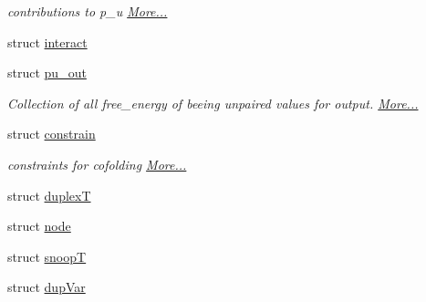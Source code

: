 \begin{DoxyCompactItemize}
\begin{DoxyCompactList}\small\item\em contributions to p\-\_\-u  \hyperlink{group__data__structures_structpu__contrib}{More...}\end{DoxyCompactList}\item 
struct \hyperlink{group__data__structures_structinteract}{interact}
\item 
struct \hyperlink{group__data__structures_structpu__out}{pu\-\_\-out}
\begin{DoxyCompactList}\small\item\em Collection of all free\-\_\-energy of beeing unpaired values for output.  \hyperlink{group__data__structures_structpu__out}{More...}\end{DoxyCompactList}\item 
struct \hyperlink{group__data__structures_structconstrain}{constrain}
\begin{DoxyCompactList}\small\item\em constraints for cofolding  \hyperlink{group__data__structures_structconstrain}{More...}\end{DoxyCompactList}\item 
struct \hyperlink{group__data__structures_structduplexT}{duplex\-T}
\item 
struct \hyperlink{group__data__structures_structnode}{node}
\item 
struct \hyperlink{group__data__structures_structsnoopT}{snoop\-T}
\item 
struct \hyperlink{group__data__structures_structdupVar}{dup\-Var}
\end{DoxyCompactItemize}
